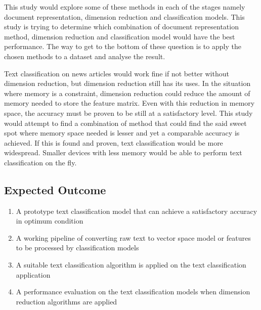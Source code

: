 This study would explore some of these methods in each of the stages namely document representation, dimension reduction and classification models. This study is trying to determine which combination of document representation method, dimension reduction and classification model would have the best performance. The way to get to the bottom of these question is to apply the chosen methods to a dataset and analyse the result.

Text classification on news articles would work fine if not better without dimension reduction, but dimension reduction still has its uses. In the situation where memory is a constraint, dimension reduction could reduce the amount of memory needed to store the feature matrix. Even with this reduction in memory space, the accuracy must be proven to be still at a satisfactory level. This study would attempt to find a combination of method that could find the said sweet spot where memory space needed is lesser and yet a comparable accuracy is achieved. If this is found and proven, text classification would be more widespread. Smaller devices with less memory would be able to perform text classification on the fly.\\


\subsection{Expected Outcome}
\begin{enumerate}
	\item A prototype text classification model that can achieve a satisfactory accuracy in optimum condition
	\item A working pipeline of converting raw text to vector space model or features to be processed by classification models
	\item A suitable text classification algorithm is applied on the text classification application
	\item A performance evaluation on the text classification models when dimension reduction algorithms are applied
\end{enumerate}

